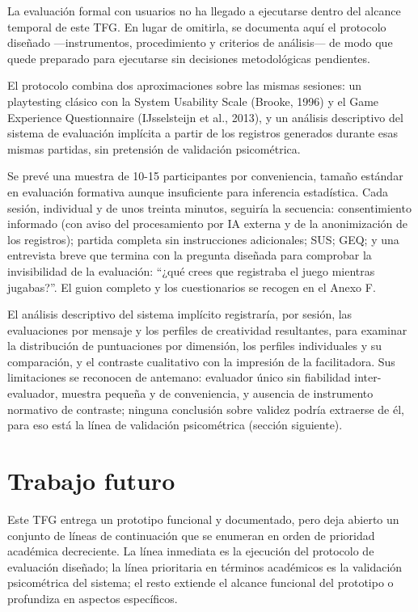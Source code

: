 \documentclass[12pt,twoside,titlepage]{report}
\begin{document}
La evaluación formal con usuarios no ha llegado a ejecutarse dentro del alcance temporal de este TFG. En lugar de omitirla, se documenta aquí el protocolo diseñado ---instrumentos, procedimiento y criterios de análisis--- de modo que quede preparado para ejecutarse sin decisiones metodológicas pendientes.

El protocolo combina dos aproximaciones sobre las mismas sesiones: un playtesting clásico con la System Usability Scale (Brooke, 1996) y el Game Experience Questionnaire (IJsselsteijn et al., 2013), y un análisis descriptivo del sistema de evaluación implícita a partir de los registros generados durante esas mismas partidas, sin pretensión de validación psicométrica.

Se prevé una muestra de 10-15 participantes por conveniencia, tamaño estándar en evaluación formativa aunque insuficiente para inferencia estadística. Cada sesión, individual y de unos treinta minutos, seguiría la secuencia: consentimiento informado (con aviso del procesamiento por IA externa y de la anonimización de los registros); partida completa sin instrucciones adicionales; SUS; GEQ; y una entrevista breve que termina con la pregunta diseñada para comprobar la invisibilidad de la evaluación: ``¿qué crees que registraba el juego mientras jugabas?''. El guion completo y los cuestionarios se recogen en el Anexo F.

El análisis descriptivo del sistema implícito registraría, por sesión, las evaluaciones por mensaje y los perfiles de creatividad resultantes, para examinar la distribución de puntuaciones por dimensión, los perfiles individuales y su comparación, y el contraste cualitativo con la impresión de la facilitadora. Sus limitaciones se reconocen de antemano: evaluador único sin fiabilidad inter-evaluador, muestra pequeña y de conveniencia, y ausencia de instrumento normativo de contraste; ninguna conclusión sobre validez podría extraerse de él, para eso está la línea de validación psicométrica (sección siguiente).

\section{Trabajo futuro}

Este TFG entrega un prototipo funcional y documentado, pero deja abierto un conjunto de líneas de continuación que se enumeran en orden de prioridad académica decreciente. La línea inmediata es la ejecución del protocolo de evaluación diseñado; la línea prioritaria en términos académicos es la validación psicométrica del sistema; el resto extiende el alcance funcional del prototipo o profundiza en aspectos específicos.
\end{document}
